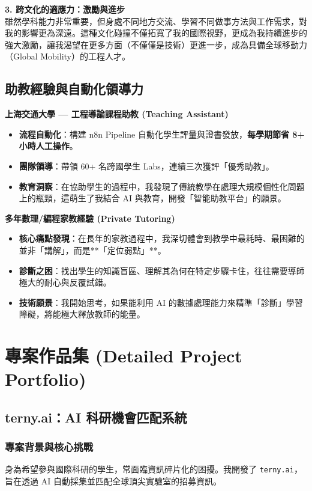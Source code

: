 \documentclass[12pt,a4paper]{article}
\begin{document}
\textbf{3. 跨文化的適應力：激勵與進步} \\
雖然學科能力非常重要，但身處不同地方交流、學習不同做事方法與工作需求，對我的影響更為深遠。這種文化碰撞不僅拓寬了我的國際視野，更成為我持續進步的強大激勵，讓我渴望在更多方面（不僅僅是技術）更進一步，成為具備全球移動力（Global Mobility）的工程人才。

\newpage

\subsection{助教經驗與自動化領導力}

\textbf{上海交通大學 — 工程導論課程助教 (Teaching Assistant)}
\begin{itemize}
    \item \textbf{流程自動化}：構建 n8n Pipeline 自動化學生評量與證書發放，\textbf{每學期節省 8+ 小時人工操作}。
    \item \textbf{團隊領導}：帶領 60+ 名跨國學生 Labs，連續三次獲評「優秀助教」。
    \item \textbf{教育洞察}：在協助學生的過程中，我發現了傳統教學在處理大規模個性化問題上的瓶頸，這萌生了我結合 AI 與教育，開發「智能助教平台」的願景。
\end{itemize}

\textbf{多年數理/編程家教經驗 (Private Tutoring)}
\begin{itemize}
    \item \textbf{核心痛點發現}：在長年的家教過程中，我深切體會到教學中最耗時、最困難的並非「講解」，而是**「定位弱點」**。
    \item \textbf{診斷之困}：找出學生的知識盲區、理解其為何在特定步驟卡住，往往需要導師極大的耐心與反覆試錯。
    \item \textbf{技術願景}：我開始思考，如果能利用 AI 的數據處理能力來精準「診斷」學習障礙，將能極大釋放教師的能量。
\end{itemize}

\newpage

\section{專案作品集 (Detailed Project Portfolio)}

\subsection{terny.ai：AI 科研機會匹配系統}

\subsubsection{專案背景與核心挑戰}
身為希望參與國際科研的學生，常面臨資訊碎片化的困擾。我開發了 \texttt{terny.ai}，旨在透過 AI 自動採集並匹配全球頂尖實驗室的招募資訊。
\end{document}
